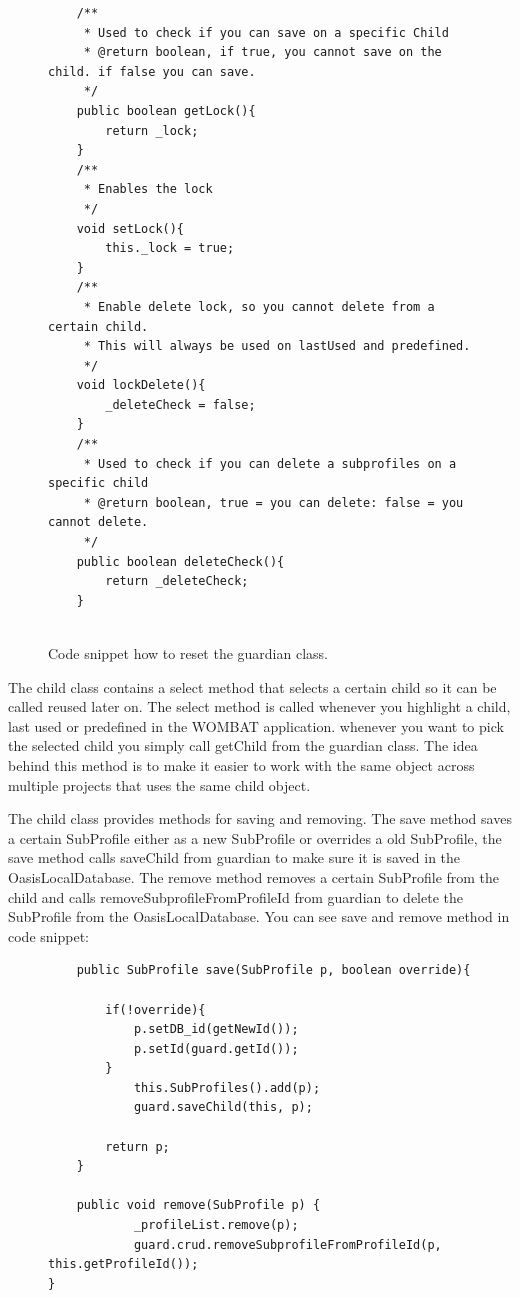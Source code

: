 \begin{description}
		\begin{figure}[H]
\begin{lstlisting}
	/**
	 * Used to check if you can save on a specific Child
	 * @return boolean, if true, you cannot save on the child. if false you can save.
	 */
	public boolean getLock(){
		return _lock;
	}
	/**
	 * Enables the lock
	 */
	void setLock(){
		this._lock = true;
	}
	/**
	 * Enable delete lock, so you cannot delete from a certain child.
	 * This will always be used on lastUsed and predefined.
	 */
	void lockDelete(){
		_deleteCheck = false;
	}
	/**
	 * Used to check if you can delete a subprofiles on a specific child
	 * @return boolean, true = you can delete: false = you cannot delete.
	 */
	public boolean deleteCheck(){
		return _deleteCheck;
	}
	
\end{lstlisting}
\caption{Code snippet how to reset the guardian class.}%
\label{code:TimerLibLocks}%
\end{figure}
	
The child class contains a select method that selects a certain child so it can be called reused later on. The select method is called whenever you highlight a child, last used or predefined in the WOMBAT application. whenever you want to pick the selected child you simply call getChild from the guardian class. The idea behind this method is to make it easier to work with the same object across multiple projects that uses the same child object.

The child class provides methods for saving and removing. The save method saves a certain SubProfile either as a new SubProfile or overrides a old SubProfile, the save method calls saveChild from guardian to make sure it is saved in the OasisLocalDatabase. The remove method removes a certain SubProfile from the child and calls removeSubprofileFromProfileId from guardian to delete the SubProfile from the OasisLocalDatabase. You can see save and remove method in code snippet: 
	
			\begin{figure}[H]
\begin{lstlisting}
	public SubProfile save(SubProfile p, boolean override){

		if(!override){
			p.setDB_id(getNewId());
			p.setId(guard.getId());
		}
			this.SubProfiles().add(p);
			guard.saveChild(this, p);
			
		return p;
	}

	public void remove(SubProfile p) {
			_profileList.remove(p);
			guard.crud.removeSubprofileFromProfileId(p, this.getProfileId());
}
	

\end{lstlisting}
\end{figure}
\end{description}
